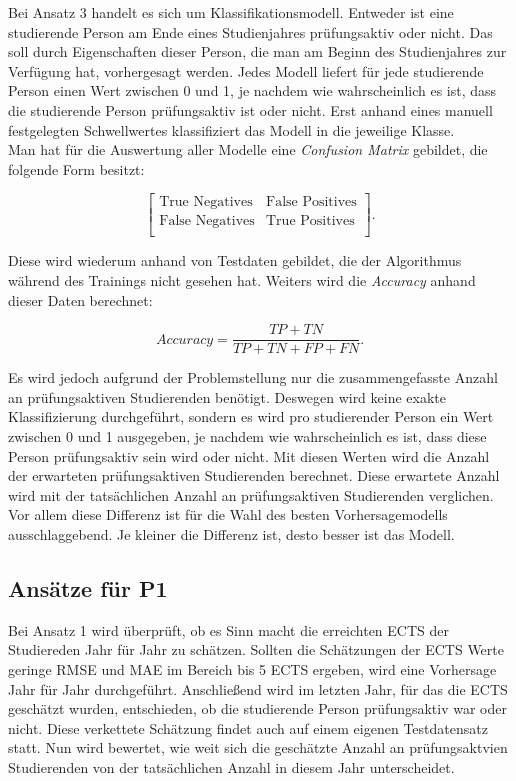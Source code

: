 Bei Ansatz 3 handelt es sich um Klassifikationsmodell. Entweder ist eine studierende Person am Ende eines Studienjahres pr\"ufungsaktiv oder nicht. Das soll 
durch Eigenschaften dieser Person, die man am Beginn des Studienjahres zur Verf\"ugung hat, vorhergesagt werden. Jedes Modell liefert f\"ur jede studierende Person
einen Wert zwischen 0 und 1, je nachdem wie wahrscheinlich es ist, dass die studierende Person pr\"ufungsaktiv ist oder nicht. Erst anhand eines manuell festgelegten 
Schwellwertes klassifiziert das Modell in die jeweilige Klasse. \\

Man hat f\"ur die Auswertung aller Modelle eine \textit{Confusion Matrix} gebildet, die folgende Form besitzt:

$$ \left[ \begin{array}{rr} \text{True Negatives} & \text{False Positives}  \\  \text{False Negatives} & \text{True Positives} \\  \end{array}\right] .$$

Diese wird wiederum anhand von Testdaten gebildet, die der Algorithmus w\"ahrend des Trainings nicht gesehen hat. Weiters wird die \textit{Accuracy} anhand dieser Daten berechnet:

$$ Accuracy = \frac{TP + TN}{TP + TN + FP + FN}.$$

Es wird jedoch aufgrund der Problemstellung nur die zusammengefasste Anzahl an pr\"ufungsaktiven Studierenden ben\"otigt. Deswegen wird keine exakte Klassifizierung durchgef\"uhrt, 
sondern es wird pro studierender Person ein Wert zwischen 0 und 1 ausgegeben, je nachdem wie wahrscheinlich es ist, dass diese Person pr\"ufungsaktiv sein wird oder nicht. 
Mit diesen Werten wird die Anzahl der erwarteten pr\"ufungsaktiven Studierenden berechnet. 
Diese erwartete Anzahl wird mit der tats\"achlichen Anzahl an pr\"ufungsaktiven Studierenden verglichen.
Vor allem diese Differenz ist f\"ur die Wahl des besten Vorhersagemodells ausschlaggebend. Je kleiner die Differenz ist, desto besser ist das Modell.



\subsection{Ans\"atze f\"ur P1}
Bei Ansatz 1 wird \"uberpr\"uft, ob es Sinn macht die erreichten ECTS der Studiereden Jahr f\"ur Jahr zu sch\"atzen. Sollten die Sch\"atzungen der 
ECTS Werte geringe RMSE und MAE im Bereich bis 5 ECTS ergeben, wird eine Vorhersage Jahr f\"ur Jahr durchgef\"uhrt. 
Anschlie{\ss}end wird im letzten Jahr, f\"ur das die ECTS gesch\"atzt wurden, entschieden, ob die studierende Person pr\"ufungsaktiv war oder nicht.  
Diese verkettete Sch\"atzung findet auch auf einem eigenen Testdatensatz statt. Nun wird bewertet, wie weit sich die gesch\"atzte Anzahl an pr\"ufungsaktvien 
Studierenden von der tats\"achlichen Anzahl in diesem Jahr unterscheidet. \\

